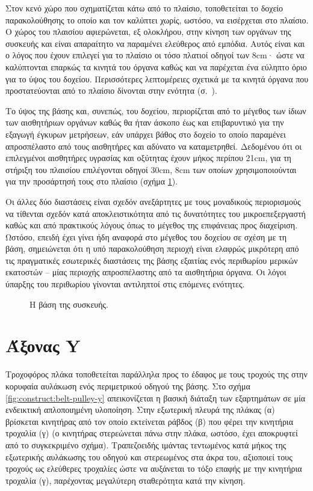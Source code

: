 Στον κενό χώρο που σχηματίζεται κάτω από το πλαίσιο, τοποθετείται το δοχείο
παρακολούθησης το οποίο και τον καλύπτει χωρίς, ωστόσο, να εισέρχεται στο
πλαίσιο. Ο χώρος του πλαισίου αφιερώνεται, εξ ολοκλήρου, στην κίνηση των οργάνων
της συσκευής και είναι απαραίτητο να παραμένει ελεύθερος από εμπόδια. Αυτός
είναι και ο λόγος που έχουν επιλεγεί για το πλαίσιο οι τόσο πλατιοί οδηγοί των
8cm· ώστε να καλύπτονται επαρκώς τα κινητά του όργανα καθώς και να παρέχεται ένα
εύληπτο όριο για το ύψος του δοχείου. Περισσότερες λεπτομέρειες σχετικά με τα
κινητά όργανα που προστατεύονται από το πλαίσιο δίνονται στην ενότητα
 (σ.~\pageref{sec:construct:z-axis}).

Το ύψος της βάσης και, συνεπώς, του δοχείου, περιορίζεται από το μέγεθος των
ίδιων των αισθητήριων οργάνων καθώς θα ήταν άσκοπο έως και επιβαρυντικό για την
εξαγωγή έγκυρων μετρήσεων, εάν υπάρχει βάθος στο δοχείο το οποίο παραμένει
απροσπέλαστο από τους αισθητήρες και αδύνατο να καταμετρηθεί.
Δεδομένου ότι οι επιλεγμένοι αισθητήρες υγρασίας και οξύτητας έχουν μήκος
περίπου 21cm, για τη στήριξη του πλαισίου επιλέγονται οδηγοί 30cm, 8cm των
οποίων χρησιμοποιούνται για την προσάρτησή τους στο πλαίσιο (σχήμα
\ref{fig:construct:base}).

Οι άλλες δύο διαστάσεις είναι σχεδόν ανεξάρτητες με τους μοναδικούς περιορισμούς
να τίθενται σχεδόν κατά αποκλειστικότητα από τις δυνατότητες του
μικροεπεξεργαστή καθώς και από πρακτικούς λόγους όπως το μέγεθος της επιφάνειας
προς διαχείριση.
Ωστόσο, επειδή έχει γίνει ήδη αναφορά στο μέγεθος του δοχείου σε σχέση με τη
βάση, σημειώνεται ότι η υπό παρακολούθηση περιοχή είναι ελαφρώς μικρότερη από
τις πραγματικές εσωτερικές διαστάσεις της βάσης εξαιτίας ενός περιθωρίου μερικών
εκατοστών -- μίας περιοχής απροσπέλαστης από τα αισθητήρια όργανα.
Οι λόγοι ύπαρξης του περιθωρίου γίνονται αντιληπτοί στις επόμενες ενότητες.

\begin{figure}
    \caption{Η βάση της συσκευής. \label{fig:construct:base}}
    \begin{center}%
    \def\svgwidth{\textwidth}
    
    \end{center}
\end{figure}


\section{Άξονας Y}

Τροχοφόρος πλάκα τοποθετείται παράλληλα προς το έδαφος με τους τροχούς της στην
κορυφαία αυλάκωση ενός περιμετρικού οδηγού της βάσης. Στο σχήμα
\ref{fig:construct:belt-pulley-y} απεικονίζεται η βασική διάταξη των εξαρτημάτων
σε μία ενδεικτική απλοποιημένη υλοποίηση.
Στην εξωτερική πλευρά της πλάκας (α) βρίσκεται κινητήρας από τον οποίο
εκτείνεται ράβδος (β) που φέρει την κινητήρια τροχαλία (γ) (ο κινητήρας
στερεώνεται πάνω στην πλάκα, ωστόσο, έχει αποκρυφτεί από το συγκεκριμένο σχήμα).
Τραπεζοειδής ιμάντας τεντωμένος κατά μήκος της εξωτερικής αυλάκωσης του οδηγού
και στερεωμένος στα άκρα του, αξιοποιεί τους τροχούς ως ελεύθερες τροχαλίες ώστε
να αυξάνεται το τόξο επαφής με την κινητήρια τροχαλία (γ), παρέχοντας μεγαλύτερη
σταθερότητα κατά την κίνηση.

